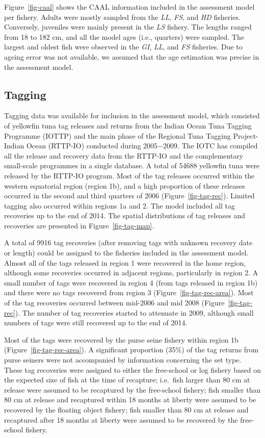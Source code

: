 \documentclass[
]{scrartcl}
\begin{document}
Figure~\ref{fig-caal} shows the CAAL information included in the
assessment model per fishery. Adults were mostly sampled from the
\emph{LL}, \emph{FS}, and \emph{HD} fisheries. Conversely, juveniles
were mainly present in the \emph{LS} fishery. The lengths ranged from 18
to 182 cm, and all the model ages (i.e., quarters) were sampled. The
largest and oldest fish were observed in the \emph{GI}, \emph{LL}, and
\emph{FS} fisheries. Due to ageing error was not available, we assumed
that the age estimation was precise in the assessment model.

\subsection{Tagging}\label{tagging}

Tagging data was available for inclusion in the assessment model, which
consisted of yellowfin tuna tag releases and returns from the Indian
Ocean Tuna Tagging Programme (IOTTP) and the main phase of the Regional
Tuna Tagging Project-Indian Ocean (RTTP-IO) conducted during 2005−2009.
The IOTC has compiled all the release and recovery data from the RTTP-IO
and the complementary small-scale programmes in a single database. A
total of 54688 yellowfin tuna were released by the RTTP-IO program. Most
of the tag releases occurred within the western equatorial region
(region 1b), and a high proportion of these releases occurred in the
second and third quarters of 2006 (Figure~\ref{fig-tag-rec}). Limited
tagging also occurred within regions 1a and 2. The model included all
tag recoveries up to the end of 2014. The spatial distributions of tag
releases and recoveries are presented in Figure~\ref{fig-tag-map}.

A total of 9916 tag recoveries (after removing tags with unknown
recovery date or length) could be assigned to the fisheries included in
the assessment model. Almost all of the tags released in region 1 were
recovered in the home region, although some recoveries occurred in
adjacent regions, particularly in region 2. A small number of tags were
recovered in region 4 (from tags released in region 1b) and there were
no tags recovered from region 3 (Figure~\ref{fig-tag-rec-area}). Most of
the tag recoveries occurred between mid-2006 and mid 2008
(Figure~\ref{fig-tag-rec}). The number of tag recoveries started to
attenuate in 2009, although small numbers of tags were still recovered
up to the end of 2014.

Most of the tags were recovered by the purse seine fishery within region
1b (Figure~\ref{fig-tag-rec-area}). A significant proportion (35\%) of
the tag returns from purse seiners were not accompanied by information
concerning the set type. These tag recoveries were assigned to either
the free-school or log fishery based on the expected size of fish at the
time of recapture; i.e.~fish larger than 80 cm at release were assumed
to be recaptured by the free-school fishery; fish smaller than 80 cm at
release and recaptured within 18 months at liberty were assumed to be
recovered by the floating object fishery; fish smaller than 80 cm at
release and recaptured after 18 months at liberty were assumed to be
recovered by the free-school fishery.
\end{document}
